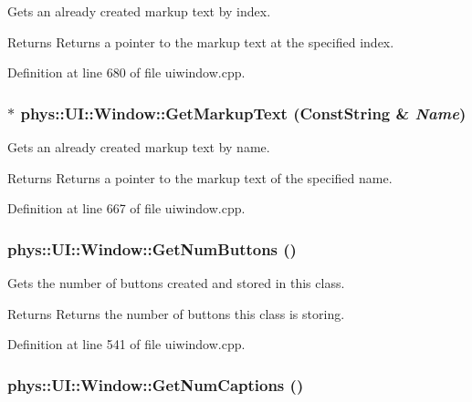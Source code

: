 Gets an already created markup text by index. 

\begin{DoxyReturn}{Returns}
Returns a pointer to the markup text at the specified index. 
\end{DoxyReturn}


Definition at line 680 of file uiwindow.cpp.

\hypertarget{classphys_1_1UI_1_1Window_af5bf2246915fc68558d2a68ed016a68b}{
\subsubsection[{GetMarkupText}]{ $\ast$ phys::UI::Window::GetMarkupText ({\bf ConstString} \& {\em Name})}}
\label{d4/d86/classphys_1_1UI_1_1Window_af5bf2246915fc68558d2a68ed016a68b}


Gets an already created markup text by name. 

\begin{DoxyReturn}{Returns}
Returns a pointer to the markup text of the specified name. 
\end{DoxyReturn}


Definition at line 667 of file uiwindow.cpp.

\hypertarget{classphys_1_1UI_1_1Window_a7eab9b4e1607a2b796072f60b6e3e0cd}{
\subsubsection[{GetNumButtons}]{ phys::UI::Window::GetNumButtons ()}}
\label{d4/d86/classphys_1_1UI_1_1Window_a7eab9b4e1607a2b796072f60b6e3e0cd}


Gets the number of buttons created and stored in this class. 

\begin{DoxyReturn}{Returns}
Returns the number of buttons this class is storing. 
\end{DoxyReturn}


Definition at line 541 of file uiwindow.cpp.

\hypertarget{classphys_1_1UI_1_1Window_a125d78e98b47a4d93f6414545fd2374c}{
\subsubsection[{GetNumCaptions}]{ phys::UI::Window::GetNumCaptions ()}}
\label{d4/d86/classphys_1_1UI_1_1Window_a125d78e98b47a4d93f6414545fd2374c}


